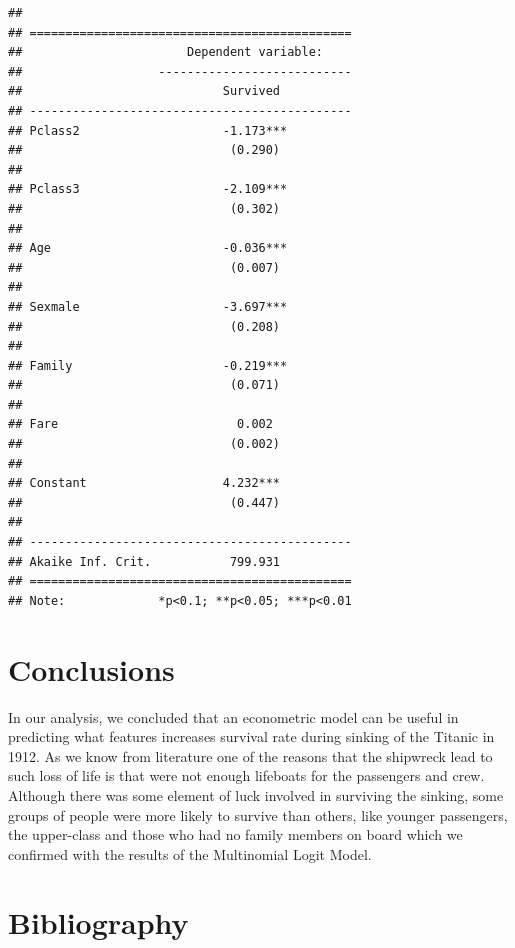 \documentclass[
]{article}
\begin{document}
\begin{verbatim}
## 
## =============================================
##                       Dependent variable:    
##                   ---------------------------
##                            Survived          
## ---------------------------------------------
## Pclass2                    -1.173***         
##                             (0.290)          
##                                              
## Pclass3                    -2.109***         
##                             (0.302)          
##                                              
## Age                        -0.036***         
##                             (0.007)          
##                                              
## Sexmale                    -3.697***         
##                             (0.208)          
##                                              
## Family                     -0.219***         
##                             (0.071)          
##                                              
## Fare                         0.002           
##                             (0.002)          
##                                              
## Constant                   4.232***          
##                             (0.447)          
##                                              
## ---------------------------------------------
## Akaike Inf. Crit.           799.931          
## =============================================
## Note:             *p<0.1; **p<0.05; ***p<0.01
\end{verbatim}

\hypertarget{conclusions}{%
\section{Conclusions}\label{conclusions}}

In our analysis, we concluded that an econometric model can be useful in
predicting what features increases survival rate during sinking of the
Titanic in 1912. As we know from literature one of the reasons that the
shipwreck lead to such loss of life is that were not enough lifeboats
for the passengers and crew. Although there was some element of luck
involved in surviving the sinking, some groups of people were more
likely to survive than others, like younger passengers, the upper-class
and those who had no family members on board which we confirmed with the
results of the Multinomial Logit Model.

\hypertarget{bibliography}{%
\section{Bibliography}\label{bibliography}}
\end{document}
